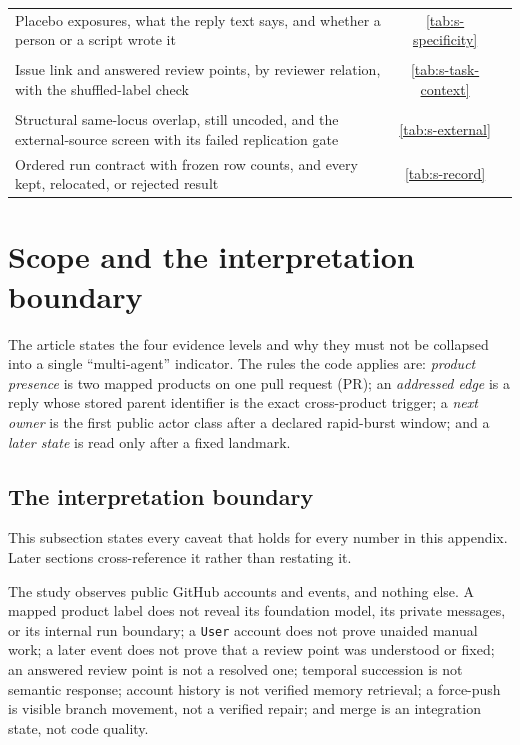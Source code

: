 \documentclass[pdflatex,sn-basic]{sn-jnl}
\begin{document}
\begin{tabularx}{\textwidth}{@{}Y c c@{}}
Placebo exposures, what the reply text says, and whether a person or a script wrote it & \ref{tab:s-specificity} & \pageref{tab:s-specificity} \\
\addlinespace
{} \\
Issue link and answered review points, by reviewer relation, with the shuffled-label check & \ref{tab:s-task-context} & \pageref{tab:s-task-context} \\
\addlinespace
{} \\
Structural same-locus overlap, still uncoded, and the external-source screen with its failed replication gate & \ref{tab:s-external} & \pageref{tab:s-external} \\
Ordered run contract with frozen row counts, and every kept, relocated, or rejected result & \ref{tab:s-record} & \pageref{tab:s-record} \\
\bottomrule
\end{tabularx}
\endgroup

\section{Scope and the interpretation boundary}\label{app:purpose}

The article states the four evidence levels and why they must not be collapsed
into a single ``multi-agent'' indicator. The rules the code applies are:
\emph{product presence} is two mapped products on one pull request (PR); an
\emph{addressed edge} is a reply whose stored parent identifier is the exact
cross-product trigger; a \emph{next owner} is the first public actor class after
a declared rapid-burst window; and a \emph{later state} is read only after a
fixed landmark.

\subsection{The interpretation boundary}\label{app:boundary}

This subsection states every caveat that holds for every number in this
appendix. Later sections cross-reference it rather than restating it.

The study observes public GitHub accounts and events, and nothing else. A mapped
product label does not reveal its foundation model, its private messages, or its
internal run boundary; a \texttt{User} account does not prove unaided manual
work; a later event does not prove that a review point was understood or fixed;
an answered review point is not a resolved one; temporal succession is not
semantic response; account history is not verified memory retrieval; a
force-push is visible branch movement, not a verified repair; and merge is an
integration state, not code quality.
\end{document}
